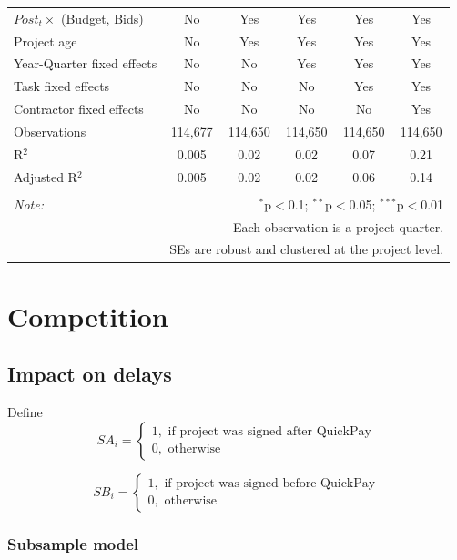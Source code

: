 \documentclass[
]{article}
\begin{document}
\begin{table}[H]
\begin{tabular}{@{\extracolsep{-2pt}}lccccc}
$Post_t \times $  (Budget, Bids) & No & Yes & Yes & Yes & Yes \\ 
Project age & No & Yes & Yes & Yes & Yes \\ 
Year-Quarter fixed effects & No & No & Yes & Yes & Yes \\ 
Task fixed effects & No & No & No & Yes & Yes \\ 
Contractor fixed effects & No & No & No & No & Yes \\ 
Observations & 114,677 & 114,650 & 114,650 & 114,650 & 114,650 \\ 
R$^{2}$ & 0.005 & 0.02 & 0.02 & 0.07 & 0.21 \\ 
Adjusted R$^{2}$ & 0.005 & 0.02 & 0.02 & 0.06 & 0.14 \\ 
\hline 
\hline \\[-1.8ex] 
\textit{Note:}  & \multicolumn{5}{r}{$^{*}$p$<$0.1; $^{**}$p$<$0.05; $^{***}$p$<$0.01} \\ 
 & \multicolumn{5}{r}{Each observation is a project-quarter.} \\ 
 & \multicolumn{5}{r}{SEs are robust and clustered at the project level.} \\ 
\end{tabular} 
\end{table}

\hypertarget{competition}{%
\section{Competition}\label{competition}}

\hypertarget{impact-on-delays}{%
\subsection{Impact on delays}\label{impact-on-delays}}

Define
\[ SA_i = \begin{cases} 1, \text{ if project was signed after QuickPay}\\
0, \text{ otherwise} \end{cases}\]

\[ SB_i = \begin{cases} 1, \text{ if project was signed before QuickPay}\\
0, \text{ otherwise} \end{cases}\]

\hypertarget{subsample-model}{%
\subsubsection{Subsample model}\label{subsample-model}}
\end{document}

